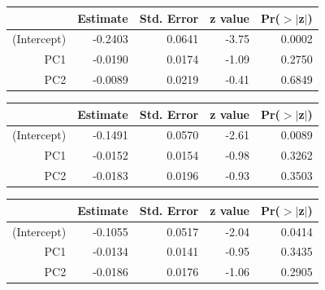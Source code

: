 \documentclass[a4paper,12pt]{Latex/Classes/PhDthesisPSnPDF}
\begin{document}
\newpage

\begin{center}
\begin{table}[ht]
\centering
\begin{tabular}{rrrrr}
  \hline
 & Estimate & Std. Error & z value & Pr($>$$|$z$|$) \\ 
  \hline
(Intercept) & -0.2403 & 0.0641 & -3.75 & 0.0002 \\ 
  PC1 & -0.0190 & 0.0174 & -1.09 & 0.2750 \\ 
  PC2 & -0.0089 & 0.0219 & -0.41 & 0.6849 \\ 
   \hline
\end{tabular}
\end{table}\end{center}


\begin{center}
\begin{table}[ht]
\centering
\begin{tabular}{rrrrr}
  \hline
 & Estimate & Std. Error & z value & Pr($>$$|$z$|$) \\ 
  \hline
(Intercept) & -0.1491 & 0.0570 & -2.61 & 0.0089 \\ 
  PC1 & -0.0152 & 0.0154 & -0.98 & 0.3262 \\ 
  PC2 & -0.0183 & 0.0196 & -0.93 & 0.3503 \\ 
   \hline
\end{tabular}
\end{table}\end{center}
\begin{center}
\begin{table}[ht]
\centering
\begin{tabular}{rrrrr}
  \hline
 & Estimate & Std. Error & z value & Pr($>$$|$z$|$) \\ 
  \hline
(Intercept) & -0.1055 & 0.0517 & -2.04 & 0.0414 \\ 
  PC1 & -0.0134 & 0.0141 & -0.95 & 0.3435 \\ 
  PC2 & -0.0186 & 0.0176 & -1.06 & 0.2905 \\ 
   \hline
\end{tabular}
\end{table}\end{center}
\end{document}
